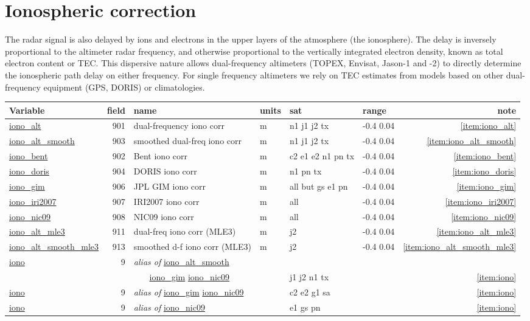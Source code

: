 \documentclass[a4paper,11pt,openany,natbib]{thesis}
\makeatletter
\newcommand\var[1]{\url{#1}\index{variables!#1@\protect\url{#1}}}
\newcommand\alias[1]{\emph{alias of} \var{#1}}
\newenvironment{vartable}{
\begin{table}[ht]
\small
\begin{tabular}{lrllllr}
\hline
Variable & field & name & units & sat & range & note \\
\hline
}{
\hline
\end{tabular}
\end{table}
}
\makeatother
\begin{document}
\section{Ionospheric correction}
The radar signal is also delayed by ions and electrons in the upper layers of the atmosphere (the ionosphere). The delay is inversely proportional to the altimeter radar frequency, and otherwise proportional to the vertically integrated electron density, known as total electron content or TEC. This dispersive nature allows dual-frequency altimeters (TOPEX, Envisat, Jason-1 and -2) to directly determine the ionospheric path delay on either frequency. For single frequency altimeters we rely on TEC estimates from models based on other dual-frequency equipment (GPS, DORIS) or climatologies.

\begin{vartable}
\var{iono_alt} & 901 & dual-frequency iono corr & m & n1 j1 j2 tx & -0.4 0.04 & \ref{item:iono_alt} \\
\var{iono_alt_smooth} & 903 & smoothed dual-freq iono corr & m & n1 j1 j2 tx & -0.4 0.04 & \ref{item:iono_alt_smooth} \\
\var{iono_bent} & 902 & Bent iono corr & m & c2 e1 e2 n1 pn tx & -0.4 0.04 & \ref{item:iono_bent} \\
\var{iono_doris} & 904 & DORIS iono corr & m & n1 pn tx & -0.4 0.04 & \ref{item:iono_doris} \\
\var{iono_gim} & 906 & JPL GIM iono corr & m & all but gs e1 pn & -0.4 0.04 & \ref{item:iono_gim} \\
\var{iono_iri2007} & 907 & IRI2007 iono corr & m & all & -0.4 0.04 & \ref{item:iono_iri2007} \\
\var{iono_nic09} & 908 & NIC09 iono corr & m & all & -0.4 0.04 & \ref{item:iono_nic09} \\
\var{iono_alt_mle3} & 911 & dual-freq iono corr (MLE3) & m & j2 & -0.4 0.04 & \ref{item:iono_alt_mle3} \\
\var{iono_alt_smooth_mle3} & 913 & smoothed d-f iono corr (MLE3) & m & j2 & -0.4 0.04 & \ref{item:iono_alt_smooth_mle3} \\
\hline
\var{iono} & 9 & \alias{iono_alt_smooth} & &  &&  \\
& & ~~~ \var{iono_gim} \var{iono_nic09} & & j1 j2 n1 tx && \ref{item:iono} \\
\var{iono} & 9 & \alias{iono_gim} \var{iono_nic09} & & c2 e2 g1 sa && \ref{item:iono} \\
\var{iono} & 9 & \alias{iono_nic09} & & e1 gs pn && \ref{item:iono} \\
\end{vartable}
\end{document}
